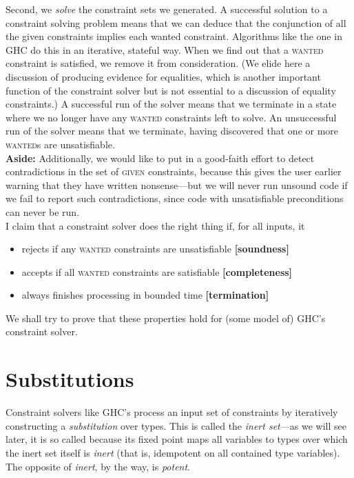 \documentclass[10pt, letterpaper, oneside]{article}
\begin{document}
Second, we \emph{solve} the constraint sets we generated. A successful solution to a constraint solving problem means that we can deduce that the conjunction of all the given constraints implies each wanted constraint. Algorithms like the one in GHC do this in an iterative, stateful way. When we find out that a \textsc{wanted} constraint is satisfied, we remove it from consideration. (We elide here a discussion of producing evidence for equalities, which is another important function of the constraint solver but is not essential to a discussion of equality constraints.) A successful run of the solver means that we terminate in a state where we no longer have any \textsc{wanted} constraints left to solve. An unsuccessful run of the solver means that we terminate, having discovered that one or more {\textsc{wanted}}s are unsatisfiable.\\

\textbf{Aside:} Additionally, we would like to put in a good-faith effort to detect contradictions in the set of \textsc{given} constraints, because this gives the user earlier warning that they have written nonsense---but we will never run unsound code if we fail to report such contradictions, since code with unsatisfiable preconditions can never be run.\\

I claim that a constraint solver does the right thing if, for all inputs, it
\begin{itemize}
\item rejects if any \textsc{wanted} constraints are unsatisfiable \textbf{[soundness]}
\item accepts if all \textsc{wanted} constraints are satisfiable \textbf{[completeness]}
\item always finishes processing in bounded time \textbf{[termination]}
\end{itemize}

We shall try to prove that these properties hold for (some model of) GHC's constraint solver.

\section{Substitutions}

Constraint solvers like GHC's process an input set of constraints by iteratively constructing a \emph{substitution} over types. This is called the \emph{inert set}---as we will see later, it is so called because its fixed point maps all variables to types over which the inert set itself is \emph{inert} (that is, idempotent on all contained type variables). The opposite of \emph{inert}, by the way, is \emph{potent}.
\end{document}
